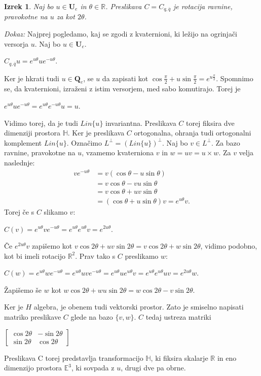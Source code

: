 \documentclass[a4paper,12pt]{article}
\def\R{\mathbb{R}} %
\def\H{\mathbb{H}} %
\def\Qe{\textbf{Q}_{e}} %
\def\Ue{\textbf{U}_{e}} %
\newcommand{\conj}[1]{\overline{#1}}
\newtheorem{izrek}{Izrek}
\begin{document}
\begin{izrek}
Naj bo $u \in \Ue$ in $\theta \in \R$. Preslikava $C = C_{q, \conj{q}}$ je rotacija ravnine, 
pravokotne na $u$ za kot $2\theta$.
\end{izrek}

\noindent
{\em Dokaz:\/} Najprej pogledamo, kaj se zgodi z kvaternioni, ki ležijo na ogrinjači versorja $u$.
Naj bo $u \in \Ue$.
\begin{center}
   $C_{q,\conj{q}}u = e^{u\theta} u e^{-u\theta}$.
\end{center}
Ker je hkrati tudi $u \in \Qe$, se $u$ da zapisati kot $\cos\frac{\pi}{2} + u\sin\frac{\pi}{2} = e^{u\frac{\pi}{2}}$.
Spomnimo se, da kvaternioni, izraženi z istim versorjem, med sabo komutirajo. Torej je
\begin{center}
   $e^{u\theta} u e^{-u\theta} = e^{u\theta}e^{-u\theta}u = u$.
\end{center}
Vidimo torej, da je tudi $Lin\{u\}$ invariantna. Preslikava $C$ torej fiksira dve dimenziji prostora $\H$.
Ker je preslikava $C$ ortogonalna, ohranja tudi ortogonalni komplement $Lin\{u\}$.
Označimo $L^{\bot} = (Lin\{u\})^{\bot}$. Naj bo $v \in L^{\bot}$. Za bazo ravnine, pravokotne na $u$, vzamemo kvaterniona $v$ in $w = uv = u \times w$.
Za $v$ velja naslednje:
\begin{align*}
   v e^{-u\theta} & = v(\cos\theta -u\sin\theta) \\
   & = v\cos\theta -vu \sin\theta \\
   & = v\cos\theta + uv\sin\theta \\
   & = (\cos\theta +u\sin\theta)v = e^{u\theta}v.
\end{align*}
Torej če s $C$ slikamo $v$:
\begin{center}
   $C(v) = e^{u\theta}v e^{-u\theta} = e^{u\theta}e^{u\theta}v = e^{2u\theta}$.
\end{center}
Če $e^{2u\theta}v$ zapišemo kot $v\cos2\theta + uv\sin2\theta = v\cos2\theta + w\sin2\theta$, vidimo podobno, kot bi imeli rotacijo $\R^2$. Prav tako s $C$ preslikamo $w$:
\begin{center}
   $C(w) = e^{u\theta}w e^{-u\theta} = e^{u\theta}uve^{-u\theta} = e^{u\theta}ue^{u\theta}v = e^{u\theta}e^{u\theta}uv = e^{2u\theta}w$.
\end{center}
Žapišemo še $w$ kot $w\cos2\theta + wu\sin2\theta = w\cos2\theta - v\sin2\theta$.

\break
Ker je $H$ algebra, je obenem tudi vektorski prostor. Zato je smiselno napisati matriko preslikave $C$ glede na bazo $\{v, w\}$.
$C$ tedaj ustreza matriki
\begin{center}
   $
   \begin{bmatrix}
      \cos2\theta & -\sin2\theta \\
      \sin2\theta & \cos2\theta
   \end{bmatrix}
   $
\end{center}
Preslikava C torej predstavlja transformacijo $\H$, ki fiksira skalarje $\R$ in eno dimenzijo prostora $\mathbb{E}^3$, ki sovpada z $u$, drugi dve pa obrne.
\end{document}
